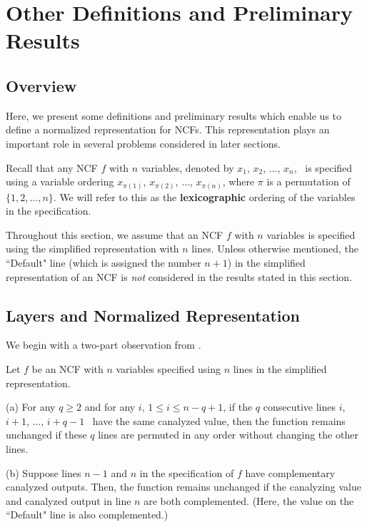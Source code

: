 \section{Other Definitions and Preliminary Results}
\label{sec:prelim}

\subsection{Overview}

Here, we present some definitions and preliminary results which enable
us to define a normalized representation for NCFs.
This representation plays an important role in several
problems considered in later sections.

\medskip

Recall that any NCF $f$ with $n$ variables,
denoted by $x_1$, $x_2$, $\ldots$, $x_n$,~
is specified using a variable ordering 
$x_{\pi(1)}$, $x_{\pi(2)}$, $\ldots$,  $x_{\pi(n)}$,
where $\pi$ is a permutation of $\{1, 2, \ldots, n\}$.
We will refer to this as the \textbf{lexicographic} ordering
of the variables in the specification.

\medskip

Throughout this section, we assume that an NCF $f$ with $n$
variables is specified using the simplified representation with $n$ lines. 
Unless otherwise mentioned, the ``Default" line (which is assigned the number $n+1$)
in the simplified representation of an NCF is \emph{not} considered
in the results stated in this section.

\subsection{Layers and Normalized Representation}
\label{sse:ncf_layer}

We begin with a two-part observation from \cite{Stearns-etal-2018}.

\begin{observation} \label{obs:ncf_transformations}
Let $f$ be an NCF with $n$ variables specified using $n$ lines
in the simplified representation. 
\begin{description}
\item{(a)} 
For any $q \geq 2$ and for any $i$, $1 \leq i \leq n-q+1$,
if the $q$ consecutive lines $i$, $i+1$, $\ldots$, $i+q-1$~
have the same canalyzed value, then the function remains
unchanged if these $q$ lines are permuted in any order
without changing the other lines.

\item{(b)} 
Suppose lines $n-1$ and $n$ in the specification of $f$ 
have complementary canalyzed outputs.
Then, the function remains unchanged 
if the canalyzing value and canalyzed output in line $n$
are both complemented. 
(Here, the value on the ``Default" line is also complemented.)
\QED
\end{description}
\end{observation}

